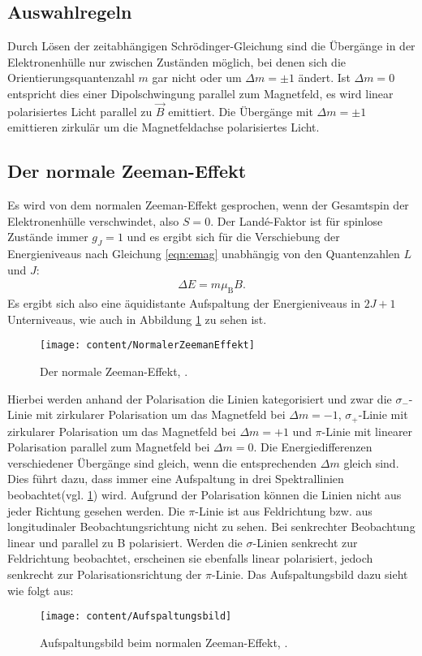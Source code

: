 \subsection{Auswahlregeln}
Durch Lösen der zeitabhängigen Schrödinger-Gleichung sind die Übergänge in der Elektronenhülle nur zwischen Zuständen möglich, bei denen sich die Orientierungsquantenzahl $m$ gar nicht oder um $\Delta m = \pm 1$ ändert. Ist $\Delta m = 0$ entspricht dies einer Dipolschwingung parallel zum Magnetfeld, es wird linear polarisiertes Licht parallel zu $\vec{B}$ emittiert. Die Übergänge mit $\Delta m = \pm 1$ emittieren zirkulär um die Magnetfeldachse polarisiertes Licht.

\subsection{Der normale Zeeman-Effekt}
Es wird von dem normalen Zeeman-Effekt gesprochen, wenn der Gesamtspin der Elektronenhülle verschwindet, also $S = 0$. Der Landé-Faktor ist für spinlose Zustände immer $g_J = 1$ und es ergibt sich für die Verschiebung der Energieniveaus nach Gleichung \ref{eqn:emag} unabhängig von den Quantenzahlen $L$ und $J$:
\begin{align}
\Delta E=m\mu_\text{B}B.
\end{align}
Es ergibt sich also eine äquidistante Aufspaltung der Energieniveaus in $2J+1$ Unterniveaus, wie auch in Abbildung \ref{fig:normalerzeemaneffekt} zu sehen ist.
\begin{figure}[h!]
	\centering
	\texttt{[image: content/NormalerZeemanEffekt]}
	\caption{Der normale Zeeman-Effekt, \cite[10]{anleitungV27}.}
	\label{fig:normalerzeemaneffekt}
\end{figure}
Hierbei werden anhand der Polarisation die Linien kategorisiert und zwar die $\sigma_-$-Linie mit zirkularer Polarisation um das Magnetfeld bei $\Delta m = -1$, $\sigma_+$-Linie mit zirkularer Polarisation um das Magnetfeld bei $\Delta m = +1$ und $\pi$-Linie mit linearer Polarisation parallel zum Magnetfeld bei $\Delta m = 0$. Die Energiedifferenzen verschiedener Übergänge sind gleich, wenn die entsprechenden $\Delta m$ gleich sind. Dies führt dazu, dass immer eine Aufspaltung in drei Spektrallinien beobachtet(vgl. \ref{fig:normalerzeemaneffekt}) wird.
Aufgrund der Polarisation können die Linien nicht aus jeder Richtung gesehen werden. Die $\pi$-Linie ist aus Feldrichtung bzw. aus longitudinaler Beobachtungsrichtung nicht zu sehen. Bei senkrechter Beobachtung linear und parallel zu B polarisiert. Werden die $\sigma$-Linien senkrecht zur Feldrichtung beobachtet, erscheinen sie ebenfalls linear polarisiert, jedoch senkrecht zur Polarisationsrichtung der $\pi$-Linie. Das Aufspaltungsbild dazu sieht wie folgt aus:
\begin{figure}[h!]
	\centering
	\texttt{[image: content/Aufspaltungsbild]}
	\caption{Aufspaltungsbild beim normalen Zeeman-Effekt, \cite[10]{anleitungV27}.}
	\label{fig:aufspaltungsbild}
\end{figure}
